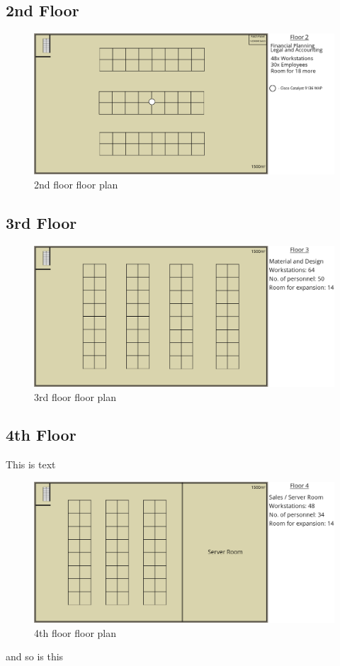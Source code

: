 \subsection{2nd Floor}
\begin{figure}[ht!]
    \includegraphics[width=15cm]{Figures/2nd-floor.png}
    \caption{2nd floor floor plan}
    \label{fig:}
\end{figure}
\subsection{3rd Floor}
\begin{figure}[h]
    \includegraphics[width=15cm]{Figures/3rd-Floor.png}
    \caption{3rd floor floor plan}
    \label{fig:3rd_floor}
\end{figure}
\subsection{4th Floor}
This is text
\begin{figure}[ht!]
    \includegraphics[width=15cm]{Figures/4th-Floor.png}
    \caption{4th floor floor plan}
    \label{fig:4th_floor}
\end{figure}
and so is this
